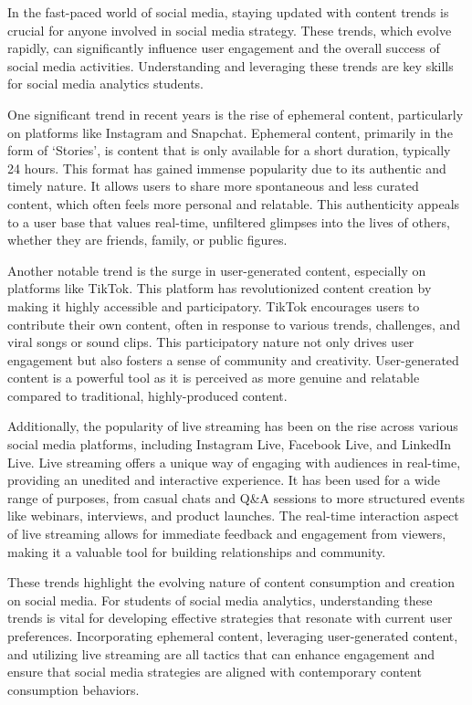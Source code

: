 \documentclass[
]{book}
\begin{document}
In the fast-paced world of social media, staying updated with content trends is crucial for anyone involved in social media strategy. These trends, which evolve rapidly, can significantly influence user engagement and the overall success of social media activities. Understanding and leveraging these trends are key skills for social media analytics students.

One significant trend in recent years is the rise of ephemeral content, particularly on platforms like Instagram and Snapchat. Ephemeral content, primarily in the form of `Stories', is content that is only available for a short duration, typically 24 hours. This format has gained immense popularity due to its authentic and timely nature. It allows users to share more spontaneous and less curated content, which often feels more personal and relatable. This authenticity appeals to a user base that values real-time, unfiltered glimpses into the lives of others, whether they are friends, family, or public figures.

Another notable trend is the surge in user-generated content, especially on platforms like TikTok. This platform has revolutionized content creation by making it highly accessible and participatory. TikTok encourages users to contribute their own content, often in response to various trends, challenges, and viral songs or sound clips. This participatory nature not only drives user engagement but also fosters a sense of community and creativity. User-generated content is a powerful tool as it is perceived as more genuine and relatable compared to traditional, highly-produced content.

Additionally, the popularity of live streaming has been on the rise across various social media platforms, including Instagram Live, Facebook Live, and LinkedIn Live. Live streaming offers a unique way of engaging with audiences in real-time, providing an unedited and interactive experience. It has been used for a wide range of purposes, from casual chats and Q\&A sessions to more structured events like webinars, interviews, and product launches. The real-time interaction aspect of live streaming allows for immediate feedback and engagement from viewers, making it a valuable tool for building relationships and community.

These trends highlight the evolving nature of content consumption and creation on social media. For students of social media analytics, understanding these trends is vital for developing effective strategies that resonate with current user preferences. Incorporating ephemeral content, leveraging user-generated content, and utilizing live streaming are all tactics that can enhance engagement and ensure that social media strategies are aligned with contemporary content consumption behaviors.
\end{document}

